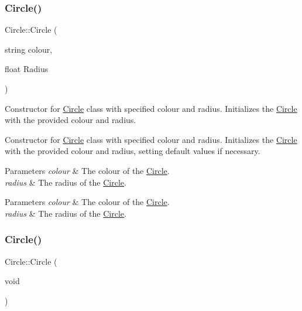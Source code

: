 \subsubsection{\texorpdfstring{Circle()}{Circle()}\hspace{0.1cm}{\footnotesize\ttfamily [1/2]}}
{\footnotesize\ttfamily Circle\+::\+Circle (\begin{DoxyParamCaption}\item[{string}]{colour,  }\item[{float}]{Radius }\end{DoxyParamCaption})}



Constructor for \mbox{\hyperlink{class_circle}{Circle}} class with specified colour and radius. Initializes the \mbox{\hyperlink{class_circle}{Circle}} with the provided colour and radius. 

Constructor for \mbox{\hyperlink{class_circle}{Circle}} class with specified colour and radius. Initializes the \mbox{\hyperlink{class_circle}{Circle}} with the provided colour and radius, setting default values if necessary.


\begin{DoxyParams}{Parameters}
{\em colour} & The colour of the \mbox{\hyperlink{class_circle}{Circle}}.\\
\hline
{\em radius} & The radius of the \mbox{\hyperlink{class_circle}{Circle}}.\\
\hline
\end{DoxyParams}



\begin{DoxyParams}{Parameters}
{\em colour} & The colour of the \mbox{\hyperlink{class_circle}{Circle}}. \\
\hline
{\em radius} & The radius of the \mbox{\hyperlink{class_circle}{Circle}}. \\
\hline
\end{DoxyParams}
\mbox{\label{class_circle_a3ea668d8be6a76ab7033c43a57874a11}} 
\subsubsection{\texorpdfstring{Circle()}{Circle()}\hspace{0.1cm}{\footnotesize\ttfamily [2/2]}}
{\footnotesize\ttfamily Circle\+::\+Circle (\begin{DoxyParamCaption}\item[{void}]{ }\end{DoxyParamCaption})}



